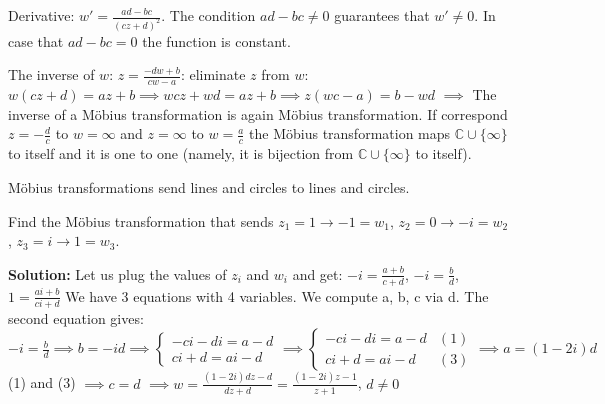 \documentclass[12pt]{article}
\begin{document}
Derivative: $w' = \frac{ad-bc}{(cz+d)^2}$. The condition $ad-bc \neq 0$ guarantees that $w' \neq 0$. In case that $ad-bc = 0$ the function is constant.

The inverse of $w$: $z = \frac{-dw+b}{cw-a}$: eliminate $z$ from $w$:
$w(cz+d) = az+b \implies wcz + wd = az+b \implies z(wc-a) = b-wd$
$\implies$ The inverse of a Möbius transformation is again Möbius transformation. If correspond $z = -\frac{d}{c}$ to $w = \infty$ and $z = \infty$ to $w = \frac{a}{c}$ the Möbius transformation maps $\mathbb{C} \cup \{\infty\}$ to itself and it is one to one (namely, it is bijection from $\mathbb{C} \cup \{\infty\}$ to itself).

\begin{proposition}
Möbius transformations send lines and circles to lines and circles.
\end{proposition}

\begin{example}
Find the Möbius transformation that sends $z_1 = 1 \to -1 = w_1$, $z_2 = 0 \to -i = w_2$, $z_3 = i \to 1 = w_3$.

\textbf{Solution:} Let us plug the values of $z_i$ and $w_i$ and get:
$-i = \frac{a+b}{c+d}$, $-i = \frac{b}{d}$, $1 = \frac{ai+b}{ci+d}$
We have 3 equations with 4 variables. We compute a, b, c via d. The second equation gives:
$-i = \frac{b}{d} \implies b = -id \implies \begin{cases} -ci-di = a-d \\ ci+d = ai-d \end{cases} \implies \begin{cases} -ci-di = a-d & (1) \\ ci+d = ai-d & (3) \end{cases} \implies a = (1-2i)d$
(1) and (3) $\implies c = d$
$\implies w = \frac{(1-2i)dz-d}{dz+d} = \frac{(1-2i)z-1}{z+1}$, $d \neq 0$
\end{example}
\end{document}
